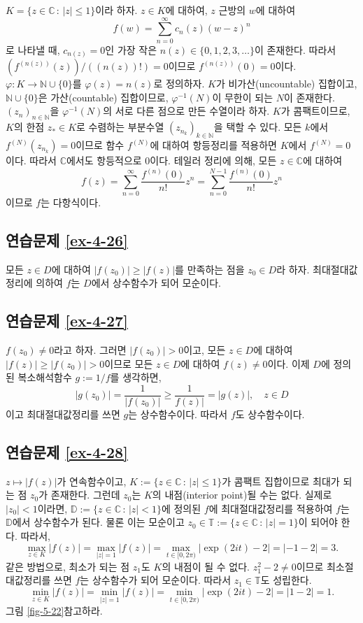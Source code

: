 $K=\{z\in\mathbb C\,:\, |z|\le 1\}$이라 하자.
$z\in K$에 대하여, $z$ 근방의 $w$에 대하여
\[
f(w) = \sum_{n=0}^\infty c_n(z)(w-z)^n
\]
로 나타낼 때, $c_{n(z)}=0$인 가장 작은 $n(z)\in\{0,1,2,3,\ldots\}$이 존재한다.
따라서 $(f^{(n(z))}(z))/((n(z))!)=0$이므로 $f^{(n(z))}(0)=0$이다.
$\varphi:K\to \mathbb N \cup \{0\}$를 $\varphi(z)=n(z)$로 정의하자.
$K$가 비가산(uncountable) 집합이고, $\mathbb N\cup \{0\}$은 가산(countable) 집합이므로,
$\varphi^{-1}(N)$이 무한이 되는 $N$이 존재한다.
$(z_n)_{n\in\mathbb N}$을 $\varphi^{-1}(N)$의 서로 다른 점으로 만든 수열이라 하자.
$K$가 콤팩트이므로, $K$의 한점 $z_*\in K$로 수렴하는 부분수열 $(z_{n_k})_{k\in\mathbb N}$을
택할 수 있다. 
모든 $k$에서 $f^{(N)}(z_{n_k})=0$이므로  함수 $f^{(N)}$에 대하여 항등정리를 적용하면
$K$에서 $f^{(N)}=0$이다. 따라서 $\mathbb C$에서도  항등적으로 $0$이다.
테일러 정리에 의해, 모든 $z\in\mathbb C$에 대하여
\[
f(z) = \sum_{n=0}^\infty \dfrac{f^{(n)}(0)}{n!} z^n= \sum_{n=0}^{N-1} \dfrac{f^{(n)}(0)}{n!}z^n
\]
이므로 $f$는 다항식이다.

\subsection*{연습문제 \ref{ex-4-26}}

모든 $z\in D$에 대하여 $|f(z_0)| \ge |f(z)|$를 만족하는 점을 $z_0\in D$라 하자.
최대절대값정리에 의하여 $f$는 $D$에서 상수함수가 되어 모순이다.

\subsection*{연습문제 \ref{ex-4-27}}

$f(z_0)\ne0$라고 하자.
그러면 $|f(z_0)|>0$이고,
모든 $z\in D$에 대하여 $|f(z)|\ge|f(z_0)|>0$이므로
모든 $z\in D$에 대하여 $f(z)\ne0$이다.
이제 $D$에 정의된 복소해석함수 $g:=1/f$를 생각하면,
\[
|g(z_0)|  = \dfrac1{|f(z_0)|} \ge \dfrac1{f(z)|} = |g(z)|,
\quad z\in D
\]
이고 최대절대값정리를 쓰면 $g$는 상수함수이다. 따라서 $f$도 상수함수이다.

\subsection*{연습문제 \ref{ex-4-28}}

$z\mapsto |f(z)|$가 연속함수이고, $K:=\{z\in \mathbb C\,:\, |z|\le 1\}$가
콤팩트 집합이므로 최대가 되는 점 $z_0$가 존재한다.
그런데 $z_0$는 $K$의 내점(interior point)될 수는 없다.
실제로 $|z_0|<1$이라면, 
$\mathbb D:=\{z\in \mathbb C\,:\, |z|<1\}$에 정의된 $f$에
최대절대값정리를 적용하여 $f$는 $\mathbb D$에서 상수함수가 된다.
물론 이는 모순이고 $z_0\in \mathbb T:=\{z\in \mathbb C\,:\, |z|= 1\}$이 되어야 한다.
따라서,
\[
\max_{z\in K} |f(z)| = \max_{|z|=1}|f(z)|
= \max_{t\in[0,2\pi)} |\exp(2it)-2| = |-1-2| = 3.
\]
같은 방법으로, 최소가 되는 점 $z_1$도 $K$의 내점이 될 수 없다.
$z_1^2-2\ne 0$이므로 최소절대값정리를 쓰면 $f$는 상수함수가 되어 모순이다.
따라서 $z_1\in\mathbb T$도 성립한다. 
\[
\min_{z\in K} |f(z)| = \min_{|z|=1}|f(z)|
= \min_{t\in[0,2\pi)} |\exp(2it)-2| = |1-2| = 1.
\]
그림 \ref{fig-5-22}\를 참고하라.


